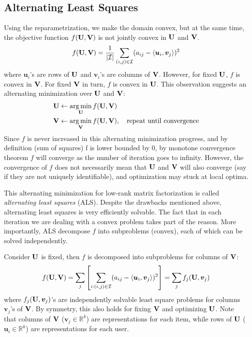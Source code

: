 \documentclass[../book-template.tex]{subfiles}
\begin{document}
\subsection{Alternating Least Squares}
Using the reparametrization, we make the domain convex, but at the same time, the objective function $f({\bf U}, {\bf V})$ is not jointly convex in ${\bf U}$ and ${\bf V}$. 
\begin{equation*}
	f({\bf U}, {\bf V})=\frac{1}{|\mathcal{I}|}\sum_{(i,j)\in \mathcal{I}}(a_{ij}-\langle\bm{u}_i,\bm{v}_j\rangle)^2
\end{equation*}
where $\bm{u}_i$'s are rows of ${\bf U}$ and $\bm{v}_i$'s are columns of ${\bf V}$. However, for fixed ${\bf U}$, $f$ is convex in ${\bf V}$. For fixed ${\bf V}$ in turn, $f$ is convex in ${\bf U}$. This observation suggests an alternating minimization over ${\bf U}$ and ${\bf V}$:
\begin{align*}
	&{\bf U}\leftarrow \mathop{\arg\min}_{{\bf U}} f({\bf U}, {\bf V})\\
	&{\bf V}\leftarrow \mathop{\arg\min}_{{\bf V}} f({\bf U}, {\bf V}),\quad \text{repeat until convergence}
\end{align*}
Since $f$ is never increased in this alternating minimization progress, and by definition (sum of squares) f is lower bounded by $0$, by monotone convergence theorem $f$ will converge as the number of iteration goes to infinity. However, the convergence of $f$ does not necessarily mean that ${\bf U}$ and ${\bf V}$ will also converge (say if they are not uniquely identifiable), and optimization may stuck at local optima.
\par This alternating minimization for low-rank matrix factorization is called \emph{alternating least squares} (ALS). Despite the drawbacks mentioned above, alternating least squares is very efficiently solvable. The fact that in each iteration we are dealing with a convex problem takes part of the reason. More importantly, ALS decompose $f$ into subproblems (convex), each of which can be solved independently. 
\par Consider ${\bf U}$ is fixed, then $f$ is decomposed into subproblems for columns of ${\bf V}$:
\begin{equation*}
		f({\bf U}, {\bf V})= \sum_{j}\left[\sum_{i:(i,j)\in \mathcal{I}} (a_{ij} - \langle \bm{u}_i,\bm{v}_j \rangle)^2\right] = \sum_{j} f_j({\bf U}, \bm{v}_j)
\end{equation*}
where $f_j({\bf U}, \bm{v}_j)$'s are independently solvable least square problems for columns $\bm{v}_j$'s of ${\bf V}$. By symmetry, this also holds for fixing ${\bf V}$ and optimizing ${\bf U}$. Note that columns of ${\bf V}$ ($\bm{v}_j \in \mathbb{R}^k$) are representations for each item, while rows of ${\bf U}$ ($\bm{u}_i \in \mathbb{R}^k$) are representations for each user. 
\end{document}
